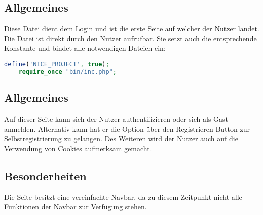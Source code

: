 \subsection{Allgemeines} Diese Datei dient dem Login und ist die erste Seite auf welcher der Nutzer landet.
Die Datei ist direkt durch den Nutzer aufrufbar. Sie setzt auch die entsprechende Konstante und bindet alle notwendigen Dateien ein:
\begin{lstlisting}[language=php]
	define('NICE_PROJECT', true);
	require_once "bin/inc.php";
\end{lstlisting}
\subsection{Allgemeines}
Auf dieser Seite kann sich der Nutzer authentifizieren oder sich als Gast anmelden. Alternativ kann hat er die Option über den Registrieren-Button zur Selbstregistrierung zu gelangen. Des Weiteren wird der Nutzer auch auf die Verwendung von Cookies aufmerksam gemacht.
\subsection{Besonderheiten}
Die Seite besitzt eine vereinfachte Navbar, da zu diesem Zeitpunkt nicht alle Funktionen der Navbar zur Verfügung stehen.